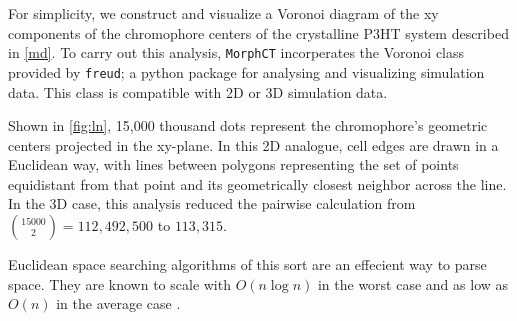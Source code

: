 For simplicity, we construct and visualize a Voronoi diagram of the xy components of the chromophore centers
of the crystalline P3HT system described in \autoref{md}. To carry out this analysis, \texttt{MorphCT} incorperates the
Voronoi class provided by \texttt{freud}; a python package for analysing and visualizing simulation data\cite{Ramasubramani2020}. 
This class is compatible with 2D or 3D simulation data. 

Shown in \autoref{fig:ln}, 15,000 thousand dots represent the chromophore's geometric centers projected
in the xy-plane. In this 2D analogue,
cell edges are drawn in a Euclidean way, with lines between polygons representing the set of points 
equidistant from that point and its geometrically closest neighbor across the line. 
In the 3D case, this analysis reduced the pairwise calculation from ${15000 \choose 2} = 112,492,500$
to $113,315$. 

Euclidean space searching algorithms of this sort are an effecient way to parse space. 
They are known to scale with $O(n\log{n})$ in the worst case and as low as $O(n)$ in the average case
\cite{Bentley1980}.


